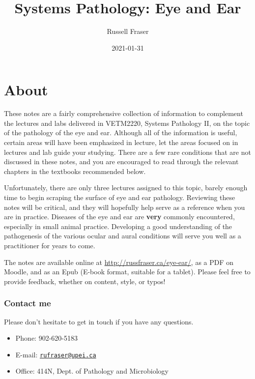 \documentclass[
  openany]{article}
\title{Systems Pathology: Eye and Ear}
\author{Russell Fraser}
\date{2021-01-31}
\providecommand{\tightlist}{%
  \setlength{\itemsep}{0pt}\setlength{\parskip}{0pt}}
\begin{document}
\maketitle

{
\setcounter{tocdepth}{2}
\tableofcontents
}
\hypertarget{about}{%
\section*{About}\label{about}}

These notes are a fairly comprehensive collection of information to complement the lectures and labs delivered in VETM2220, Systems Pathology II, on the topic of the pathology of the eye and ear. Although all of the information is useful, certain areas will have been emphasized in lecture, let the areas focused on in lectures and lab guide your studying. There are a few rare conditions that are not discussed in these notes, and you are encouraged to read through the relevant chapters in the textbooks recommended below.

Unfortunately, there are only three lectures assigned to this topic, barely enough time to begin scraping the surface of eye and ear pathology. Reviewing these notes will be critical, and they will hopefully help serve as a reference when you are in practice. Diseases of the eye and ear are \textbf{very} commonly encountered, especially in small animal practice. Developing a good understanding of the pathogenesis of the various ocular and aural conditions will serve you well as a practitioner for years to come.

The notes are available online at \url{http://russfraser.ca/eye-ear/}, as a PDF on Moodle, and as an Epub (E-book format, suitable for a tablet). Please feel free to provide feedback, whether on content, style, or typos!

\hypertarget{contact-me}{%
\subsubsection*{Contact me}\label{contact-me}}

Please don't hesitate to get in touch if you have any questions.

\begin{itemize}
\tightlist
\item
  Phone: 902-620-5183
\item
  E-mail: \href{mailto:rufraser@upei.ca}{\nolinkurl{rufraser@upei.ca}}
\item
  Office: 414N, Dept. of Pathology and Microbiology
\end{itemize}
\end{document}
